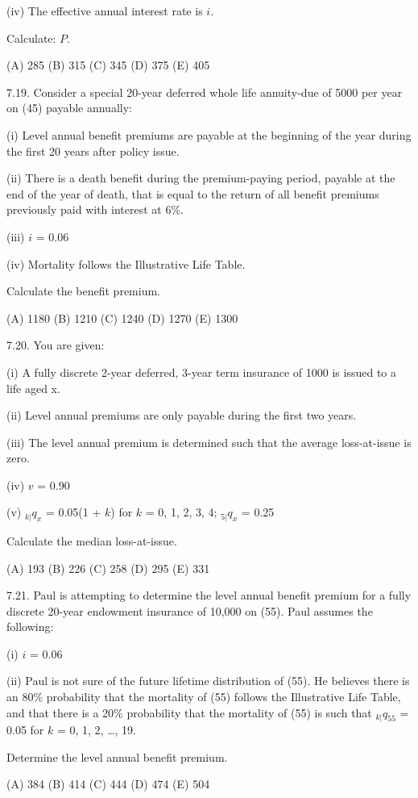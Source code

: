\documentclass[]{book}
\begin{document}
(iv) The effective annual interest rate is \(i\).

Calculate: \(P\).

(A) 285 (B) 315 (C) 345 (D) 375 (E) 405

7.19. Consider a special 20-year deferred whole life annuity-due of 5000
per year on (45) payable annually:

(i) Level annual benefit premiums are payable at the beginning of the
year during the first 20 years after policy issue.

(ii) There is a death benefit during the premium-paying period, payable
at the end of the year of death, that is equal to the return of all
benefit premiums previously paid with interest at 6\%.

(iii) \(i\) = 0.06

(iv) Mortality follows the Illustrative Life Table.

Calculate the benefit premium.

(A) 1180 (B) 1210 (C) 1240 (D) 1270 (E) 1300

7.20. You are given:

(i) A fully discrete 2-year deferred, 3-year term insurance of 1000 is
issued to a life aged x.

(ii) Level annual premiums are only payable during the first two years.

(iii) The level annual premium is determined such that the average
loss-at-issue is zero.

(iv) \(v\) = 0.90

(v) \({}_{k|}q_x\) = 0.05(1 + \(k\)) for \(k\) = 0, 1, 2, 3, 4;
\({}_{5|}q_x\) = 0.25

Calculate the median loss-at-issue.

(A) 193 (B) 226 (C) 258 (D) 295 (E) 331

7.21. Paul is attempting to determine the level annual benefit premium
for a fully discrete 20-year endowment insurance of 10,000 on (55). Paul
assumes the following:

(i) \(i\) = 0.06

(ii) Paul is not sure of the future lifetime distribution of (55). He
believes there is an 80\% probability that the mortality of (55) follows
the Illustrative Life Table, and that there is a 20\% probability that
the mortality of (55) is such that \({}_{k|}q_{55}\) = 0.05 for \(k\) =
0, 1, 2, \ldots{}, 19.

Determine the level annual benefit premium.

(A) 384 (B) 414 (C) 444 (D) 474 (E) 504
\end{document}
